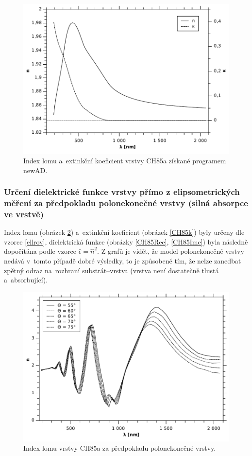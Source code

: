 \documentclass[12pt]{article}
\begin{document}
\begin{figure}
  \centering
  \includegraphics[width=135mm]{img/CH85-nk.pdf}
  \caption{Index lomu a~extinkční koeficient vrstvy CH85a získané programem newAD.}
  \label{CH85nk}
\end{figure}

\subsubsection{Určení dielektrické funkce vrstvy přímo z elipsometrických měření za předpokladu polonekonečné vrstvy (silná absorpce ve vrstvě)}

Index lomu (obrázek \ref{CH85n}) a~extinkční koeficient (obrázek \ref{CH85k}) byly určeny dle vzorce \ref{ellrov}, dielektrická funkce (obrázky \ref{CH85Ree}, \ref{CH85Ime}) byla následně dopočítána podle vzorce $\hat{\epsilon} = \hat{n}^2$. Z grafů je vidět, že model polonekonečné vrstvy nedává v~tomto případě dobré výsledky, to je způsobené tím, že nelze zanedbat zpětný odraz na~rozhraní substrát--vrstva (vrstva není dostatečně tlustá a~absorbující).

\begin{figure}
  \centering
  \includegraphics[width=135mm]{img/CH85-n.pdf}
  \caption{Index lomu vrstvy CH85a za předpokladu polonekonečné vrstvy.}
  \label{CH85n}
\end{figure}
\end{document}
